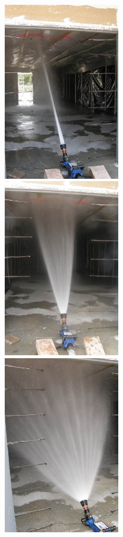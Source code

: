 \documentclass[12pt,oneside]{book}
\begin{document}
\begin{figure}[!ht]
\minipage{2.15in}
\begin{center}
	\includegraphics[width=2in]{../Pictures/SS_near}
\end{center} 
\endminipage \hfill
\minipage{2.15in}
\begin{center}
	\includegraphics[width=2in]{../Pictures/NF_near}
\end{center}
\endminipage \hfill
\minipage{2.15in}
\begin{center}
	\includegraphics[width=2in]{../Pictures/WF_near}

\end{center}
\end{figure}
\end{document}
